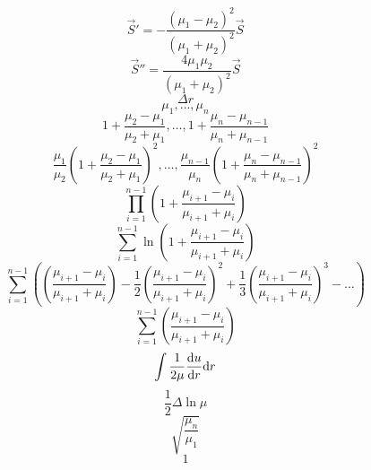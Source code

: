 \begin{equation}
    \vec{S}'=-\frac{(\mu_1-\mu_2)^2}{(\mu_1+\mu_2)^2}\vec{S}
\end{equation}
\begin{equation}
    \vec{S}''=\frac{4\mu_1\mu_2}{(\mu_1+\mu_2)^2}\vec{S}
\end{equation}
\begin{equation}
    \Delta r
\end{equation}
\begin{equation}
    \mu_1,\dots,\mu_n
\end{equation}
\begin{equation}
    1+\frac{\mu_2-\mu_1}{\mu_2+\mu_1},\dots,1+\frac{\mu_n-\mu_{n-1}}{\mu_n+\mu_{n-1}}
\end{equation}
\begin{equation}
    \frac{\mu_1}{\mu_2}(1+\frac{\mu_2-\mu_1}{\mu_2+\mu_1})^2,\dots,\frac{\mu_{n-1}}{\mu_n}(1+\frac{\mu_n-\mu_{n-1}}{\mu_n+\mu_{n-1}})^2
\end{equation}
\begin{equation}
    \prod_{i=1}^{n-1}(1+\frac{\mu_{i+1}-\mu_i}{\mu_{i+1}+\mu_i})
\end{equation}
\begin{equation}
    \sum_{i=1}^{n-1}\ln(1+\frac{\mu_{i+1}-\mu_i}{\mu_{i+1}+\mu_i})
\end{equation}
\begin{equation}
    \sum_{i=1}^{n-1}((\frac{\mu_{i+1}-\mu_i}{\mu_{i+1}+\mu_i})-\frac{1}{2}(\frac{\mu_{i+1}-\mu_i}{\mu_{i+1}+\mu_i})^2+\frac{1}{3}(\frac{\mu_{i+1}-\mu_i}{\mu_{i+1}+\mu_i})^3-\dots)
\end{equation}
\begin{equation}
    \sum_{i=1}^{n-1}(\frac{\mu_{i+1}-\mu_i}{\mu_{i+1}+\mu_i})
\end{equation}
\begin{equation}
    \int\frac{1}{2\mu}\frac{\mathrm{d} u}{\mathrm{d} r}\mathrm{d} r
\end{equation}
\begin{equation}
    \frac{1}{2}\Delta\ln\mu
\end{equation}
\begin{equation}
    \sqrt{\frac{\mu_n}{\mu_1}}
\end{equation}
\begin{equation}
    1
\end{equation}
